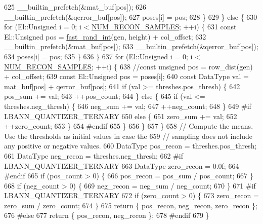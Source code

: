 \begin{DoxyCode}
625         \_\_builtin\_prefetch(&mat\_buf[pos]);
626         \_\_builtin\_prefetch(&qerror\_buf[pos]);
627         poses[i] = pos;
628       \}
629     \} \textcolor{keywordflow}{else} \{
630       \textcolor{keywordflow}{for} (El::Unsigned i = 0; i < \hyperlink{classlbann_1_1lbann__quantizer_a10667e56db4218aac3912c6bae28fc41}{NUM\_RECON\_SAMPLES}; ++i) \{
631         \textcolor{keyword}{const} El::Unsigned pos = \hyperlink{namespacelbann_a557aaed6267e7aaf583a75149e9c670c}{fast\_rand\_int}(gen, height) + col\_offset;
632         \_\_builtin\_prefetch(&mat\_buf[pos]);
633         \_\_builtin\_prefetch(&qerror\_buf[pos]);
634         poses[i] = pos;
635       \}
636     \}
637     \textcolor{keywordflow}{for} (El::Unsigned i = 0; i < \hyperlink{classlbann_1_1lbann__quantizer_a10667e56db4218aac3912c6bae28fc41}{NUM\_RECON\_SAMPLES}; ++i) \{
638       \textcolor{comment}{//const unsigned pos = row\_dist(gen) + col\_offset;}
639       \textcolor{keyword}{const} El::Unsigned pos = poses[i];
640       \textcolor{keyword}{const} DataType val = mat\_buf[pos] + qerror\_buf[pos];
641       \textcolor{keywordflow}{if} (val >= threshes.pos\_thresh) \{
642         pos\_sum += val;
643         ++pos\_count;
644       \} \textcolor{keywordflow}{else} \{
645         \textcolor{keywordflow}{if} (val <= threshes.neg\_thresh) \{
646           neg\_sum += val;
647           ++neg\_count;
648         \}
649 \textcolor{preprocessor}{#if LBANN\_QUANTIZER\_TERNARY}
650         \textcolor{keywordflow}{else} \{
651           zero\_sum += val;
652           ++zero\_count;
653         \}
654 \textcolor{preprocessor}{#endif}
655       \}
656     \}
657   \}
658   \textcolor{comment}{// Compute the means. Use the thresholds as initial values in case the}
659   \textcolor{comment}{// sampling does not include any positive or negative values.}
660   DataType pos\_recon = threshes.pos\_thresh;
661   DataType neg\_recon = threshes.neg\_thresh;
662 \textcolor{preprocessor}{#if LBANN\_QUANTIZER\_TERNARY}
663   DataType zero\_recon = 0.0f;
664 \textcolor{preprocessor}{#endif}
665   \textcolor{keywordflow}{if} (pos\_count > 0) \{
666     pos\_recon = pos\_sum / pos\_count;
667   \}
668   \textcolor{keywordflow}{if} (neg\_count > 0) \{
669     neg\_recon = neg\_sum / neg\_count;
670   \}
671 \textcolor{preprocessor}{#if LBANN\_QUANTIZER\_TERNARY}
672   \textcolor{keywordflow}{if} (zero\_count > 0) \{
673     zero\_recon = zero\_sum / zero\_count;
674   \}
675   \textcolor{keywordflow}{return} \{ pos\_recon, neg\_recon, zero\_recon \};
676 \textcolor{preprocessor}{#else}
677   \textcolor{keywordflow}{return} \{ pos\_recon, neg\_recon \};
678 \textcolor{preprocessor}{#endif}
679 \}
\end{DoxyCode}
